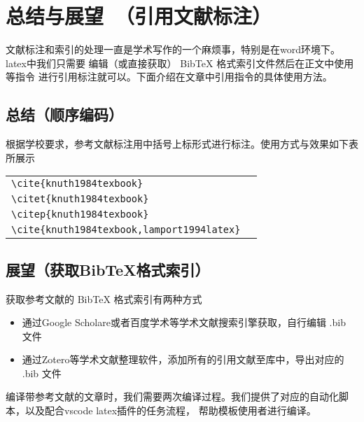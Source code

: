 \chapter{总结与展望 （引用文献标注）}

文献标注和索引的处理一直是学术写作的一个麻烦事，特别是在word环境下。latex中我们只需要
编辑（或直接获取） BibTeX 格式索引文件然后在正文中使用 等指令
进行引用标注就可以。下面介绍在文章中引用指令的具体使用方法。

\section{总结（顺序编码）}

根据学校要求，参考文献标注用中括号上标形式进行标注。使用方式与效果如下表所展示

\begin{tabular}{l@{\quad$\Rightarrow$\quad}l}
	\verb|\cite{knuth1984texbook}|               & \cite{knuth1984texbook}               \\
	\verb|\citet{knuth1984texbook}|              & \citet{knuth1984texbook}              \\
	\verb|\citep{knuth1984texbook}|              & \citep{knuth1984texbook}              \\
	\verb|\cite{knuth1984texbook,lamport1994latex}| & \cite{knuth1984texbook,lamport1994latex} \\
\end{tabular}

\section{展望（获取BibTeX格式索引）}

获取参考文献的 BibTeX 格式索引有两种方式

\begin{itemize}
	\item 通过Google Scholare或者百度学术等学术文献搜索引擎获取，自行编辑 .bib 文件
	\item 通过Zotero等学术文献整理软件，添加所有的引用文献至库中，导出对应的 .bib 文件
\end{itemize}

编译带参考文献的文章时，我们需要两次编译过程。我们提供了对应的自动化脚本，以及配合vscode latex插件的任务流程，
帮助模板使用者进行编译。

